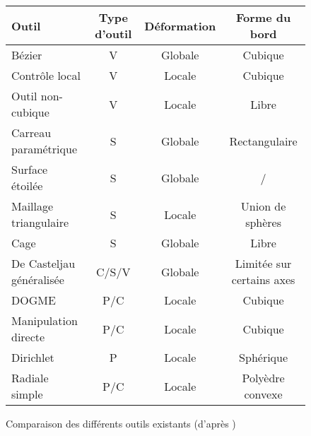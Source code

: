 \begin{figure}[h]
  \begin{center}
    \begin{tabular}{|l|c|c|c|}
      \hline
      \textbf{Outil} & \textbf{Type d'outil} & \textbf{Déformation} & \textbf{Forme du bord} \\
      \hline
      \hline
      Bézier & V & Globale & Cubique\\
      \hline
      Contrôle local & V & Locale & Cubique\\
      \hline
      Outil non-cubique & V & Locale & Libre\\
      \hline
      \hline
      Carreau paramétrique & S & Globale & Rectangulaire\\
      \hline
      Surface étoilée & S & Globale & /\\
      \hline
      Maillage triangulaire & S & Locale & Union de sphères\\
      \hline
      Cage & S & Globale & Libre\\
      \hline
      \hline
      De Casteljau généralisée & C/S/V & Globale & Limitée sur certains axes\\
      \hline
      DOGME & P/C & Locale & Cubique\\
      \hline
      Manipulation directe & P/C & Locale & Cubique\\
      \hline
      Dirichlet & P & Locale & Sphérique\\
      \hline
      Radiale simple & P/C & Locale & Polyèdre convexe\\
      \hline
    \end{tabular}
    \caption{Comparaison des différents outils existants (d'après
      \cite{GB08})}
  \end{center}
\end{figure}


